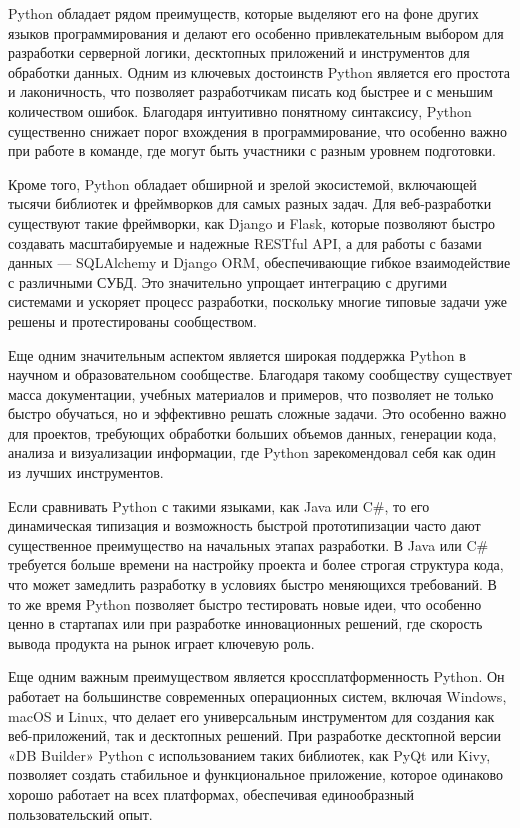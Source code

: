 Python обладает рядом преимуществ, которые выделяют его на фоне других языков программирования и делают его особенно привлекательным выбором для разработки серверной логики, десктопных приложений и инструментов для обработки данных. Одним из ключевых достоинств Python является его простота и лаконичность, что позволяет разработчикам писать код быстрее и с меньшим количеством ошибок. Благодаря интуитивно понятному синтаксису, Python существенно снижает порог вхождения в программирование, что особенно важно при работе в команде, где могут быть участники с разным уровнем подготовки.

Кроме того, Python обладает обширной и зрелой экосистемой, включающей тысячи библиотек и фреймворков для самых разных задач. Для веб-разработки существуют такие фреймворки, как Django и Flask, которые позволяют быстро создавать масштабируемые и надежные RESTful API, а для работы с базами данных — SQLAlchemy и Django ORM, обеспечивающие гибкое взаимодействие с различными СУБД. Это значительно упрощает интеграцию с другими системами и ускоряет процесс разработки, поскольку многие типовые задачи уже решены и протестированы сообществом.

Еще одним значительным аспектом является широкая поддержка Python в научном и образовательном сообществе. Благодаря такому сообществу существует масса документации, учебных материалов и примеров, что позволяет не только быстро обучаться, но и эффективно решать сложные задачи. Это особенно важно для проектов, требующих обработки больших объемов данных, генерации кода, анализа и визуализации информации, где Python зарекомендовал себя как один из лучших инструментов.

Если сравнивать Python с такими языками, как Java или C\#, то его динамическая типизация и возможность быстрой прототипизации часто дают существенное преимущество на начальных этапах разработки. В Java или C\# требуется больше времени на настройку проекта и более строгая структура кода, что может замедлить разработку в условиях быстро меняющихся требований. В то же время Python позволяет быстро тестировать новые идеи, что особенно ценно в стартапах или при разработке инновационных решений, где скорость вывода продукта на рынок играет ключевую роль.

Еще одним важным преимуществом является кроссплатформенность Python. Он работает на большинстве современных операционных систем, включая Windows, macOS и Linux, что делает его универсальным инструментом для создания как веб-приложений, так и десктопных решений. При разработке десктопной версии «DB Builder» Python с использованием таких библиотек, как PyQt или Kivy, позволяет создать стабильное и функциональное приложение, которое одинаково хорошо работает на всех платформах, обеспечивая единообразный пользовательский опыт.

